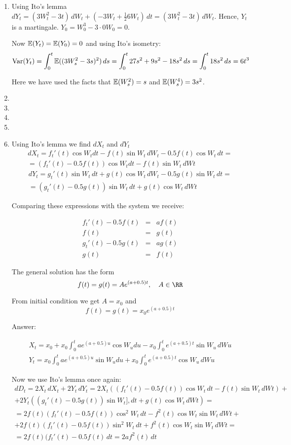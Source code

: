 \documentclass[12pt, a4paper]{article}
\begin{document}
\begin{enumerate}
\item Using Ito’s lemma $dY_t = (3W_t^2 - 3t) \, dW_t + (-3W_t + \frac{1}{2}6W_t) \, dt= (3W_t^2 - 3t) \, dW_t$. Hence, $Y_t$ is a martingale. $Y_0=W_0^3-3\cdot 0 W_0=0$.

Now $\mathbb{E}(Y_t)=\mathbb{E}(Y_0)=0$ and using Ito's isometry:
\[
\operatorname{Var}(Y_t)=
\int_0^t \mathbb{E}((3W_s^2-3s)^2) \, ds = \int_0^t 27s^2 +9s^2-18s^2 \, ds = \int_0^t 18s^2 \, ds = 6t^3
\]

Here we have used the facts that $\mathbb{E}(W_s^2)=s$ and $\mathbb{E}(W_s^4)=3s^2$.
\item
\item
\item
\item

\item Using Ito's lemma  we find $dX_t$ and $dY_t$
\label{spiral_wiener}
\begin{multline*}
dX_t=f_t'(t) \cos W_t dt -f(t)\sin W_t \, dW_t-0.5f(t)\cos W_t\, dt=\\
= (f_t'(t)-0.5f(t))\cos W_tdt -f(t)\sin W_t \,dWt
\end{multline*}
\begin{multline*}
dY_t=g_t'(t) \sin W_t \, dt +g(t)\cos W_t \, dW_t-0.5g(t)\sin W_t\,dt=\\
= (g_t'(t)-0.5g(t))\sin W_t\,dt +g(t)\cos W_t \,dWt
\end{multline*}

Comparing these expressions with the system we receive:

\[
\begin{array}{rcl}
f_t'(t)-0.5f(t) &=& af(t)\\
f(t)&=&g(t)\\
 g_t'(t)-0.5g(t)&=&ag(t)\\
g(t)&=&f(t)
\end{array}
\]

The general solution has the form
\[
f(t)=g(t)=A e^{(a+0.5)t}, \quad A\in  \RR
\]

From initial condition we get $A=x_0$ and
\[
f(t)=g(t)=x_0 e^{(a+0.5)t}
\]

Answer:

\[
\begin{array}{l}
X_t=x_0+x_0\int_{0}^{t} a e^{(a+0.5)u} \cos W_u du - x_0\int_{0}^{t} e^{(a+0.5)t}\sin W_u \,dWu\\
Y_t=x_0\int_{0}^{t} a e^{(a+0.5)u} \sin W_u du +x_0\int_{0}^{t} e^{(a+0.5)t}\cos W_u \, dWu
\end{array}
\]


Now we use Ito's lemma once again:
\begin{multline*}
dD_t=2X_t \, dX_t+2Y_t \, dY_t=2X_t((f_t'(t)-0.5f(t))\cos W_t \, dt -f(t)\sin W_t \,dWt)+\\
+ 2Y_t((g_t'(t)-0.5g(t))\sin W_t ], dt +g(t)\cos W_t\,dWt)=\\
=2f(t)(f_t'(t)-0.5f(t))\cos^2 W_t \, dt-f^2(t)\cos W_t\sin W_t\,dWt+\\
+2f(t)(f_t'(t)-0.5f(t))\sin^2 W_t \, dt+f^2(t)\cos W_t\sin W_t\,dWt=\\
=2f(t)(f_t'(t)-0.5f(t) \, dt=2af^2(t)\,dt
\end{multline*}


\end{enumerate}
\end{document}
